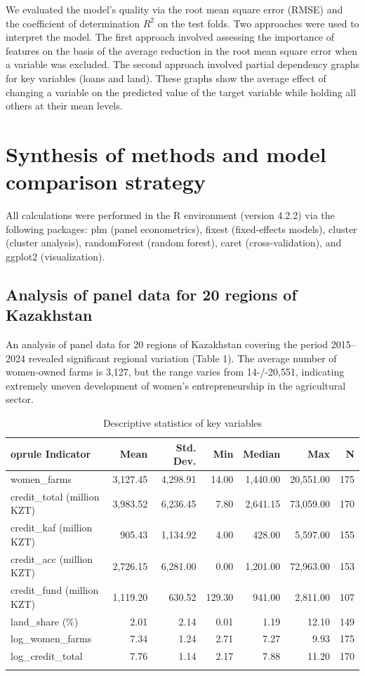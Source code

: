 ﻿\documentclass[pdflatex,sn-mathphys-ay]{sn-jnl}
\begin{document}
We evaluated the model's quality via the root mean square error (RMSE)
and the coefficient of determination $R^2$ on the test folds. Two
approaches were used to interpret the model. The first approach involved
assessing the importance of features on the basis of the average reduction in
the root mean square error when a variable was excluded. The second
approach involved partial dependency graphs for key variables (loans and
land). These graphs show the average effect of changing a variable on
the predicted value of the target variable while holding all others at
their mean levels.

\section{Synthesis of methods and model comparison strategy}

All calculations were performed in the R environment (version 4.2.2)
via the following packages: plm (panel econometrics), fixest
(fixed-effects models), cluster (cluster analysis), randomForest (random
forest), caret (cross-validation), and ggplot2 (visualization).

\subsection{Analysis of panel data for 20 regions of Kazakhstan}

An analysis of panel data for 20 regions of Kazakhstan covering the
period 2015--2024 revealed significant regional variation (Table 1). The
average number of women-owned farms is 3,127, but the range varies from
14-/-20,551, indicating extremely uneven development of women's
entrepreneurship in the agricultural sector.

\begin{table}[htbp]
\caption{Descriptive statistics of key variables}\label{tab:descriptive}
\small
\begin{tabular*}{\textwidth}{@{\extracolsep{\fill}}p{}rrrrrr@{}}
	oprule
Indicator & Mean & Std. Dev. & Min & Median & Max & N\\
\midrule
women\_farms & 3,127.45 & 4,298.91 & 14.00 & 1,440.00 & 20,551.00 & 175\\
credit\_total (million KZT) & 3,983.52 & 6,236.45 & 7.80 & 2,641.15 & 73,059.00 & 170\\
credit\_kaf (million KZT) & 905.43 & 1,134.92 & 4.00 & 428.00 & 5,597.00 & 155\\
credit\_acc (million KZT) & 2,726.15 & 6,281.00 & 0.00 & 1,201.00 & 72,963.00 & 153\\
credit\_fund (million KZT) & 1,119.20 & 630.52 & 129.30 & 941.00 & 2,811.00 & 107\\
land\_share (\%) & 2.01 & 2.14 & 0.01 & 1.19 & 12.10 & 149\\
log\_women\_farms & 7.34 & 1.24 & 2.71 & 7.27 & 9.93 & 175\\
log\_credit\_total & 7.76 & 1.14 & 2.17 & 7.88 & 11.20 & 170\\
\botrule
\end{tabular*}
\end{table}
\end{document}
